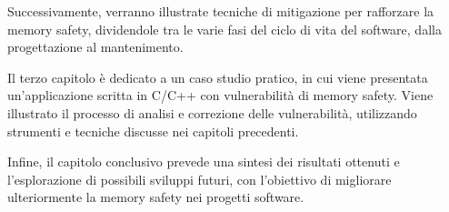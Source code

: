 Successivamente, verranno illustrate tecniche di mitigazione per rafforzare la memory
safety, dividendole tra le varie fasi del ciclo di vita del software, dalla progettazione
al mantenimento.

Il terzo capitolo è dedicato a un caso studio pratico, in cui viene presentata
un'applicazione scritta in C/C++ con vulnerabilità di memory safety. Viene illustrato
il processo di analisi e correzione delle vulnerabilità, utilizzando strumenti e
tecniche discusse nei capitoli precedenti.

Infine, il capitolo conclusivo prevede una sintesi dei risultati ottenuti e l'esplorazione
di possibili sviluppi futuri, con l'obiettivo di migliorare ulteriormente la
memory safety nei progetti software.